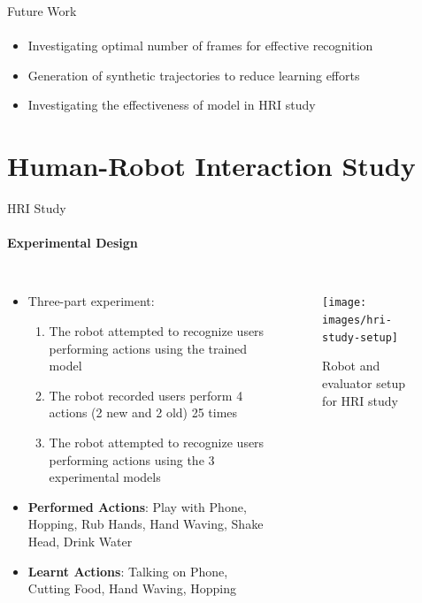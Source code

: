 \documentclass[aspectratio=169, xcolor=dvipsnames]{beamer}
\begin{document}
\begin{frame}{Future Work}
      \framesubtitle{}%
      
      \begin{itemize}
            \item Investigating optimal number of frames for effective recognition
            \item Generation of synthetic trajectories to reduce learning efforts
            \item Investigating the effectiveness of model in HRI study 
      \end{itemize}
\end{frame}

\section{Human-Robot Interaction Study}

\begin{frame}{HRI Study}
      \framesubtitle{Experimental Design}%
      
      \begin{columns}
      \vspace{-0.25cm}
      \begin{itemize}
            \item Three-part experiment:
            {\small
            \begin{enumerate}
                  \item The robot attempted to recognize users performing actions using the trained model
                  \item The robot recorded users perform 4 actions (2 new and 2 old) 25 times
                  \item The robot attempted to recognize users performing actions using the 3 experimental models
            \end{enumerate}
            }
            \vspace{0.5cm}
            \item \textbf{Performed Actions}: {\small Play with Phone, Hopping, Rub Hands, Hand Waving, Shake Head, Drink Water}
            \item \textbf{Learnt Actions}: {\small Talking on Phone, Cutting Food, Hand Waving, Hopping}
      \end{itemize}
      
      \begin{figure}[ht!]
            \centering
            \texttt{[image: images/hri-study-setup]}
            \caption{Robot and evaluator setup for HRI study}
      \end{figure} 
      \end{columns}
\end{frame}
\end{document}
